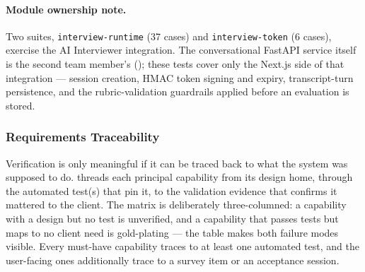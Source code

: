 \paragraph{Module ownership note.}
Two suites, \texttt{interview-runtime} (37 cases) and \texttt{interview-token}
(6 cases), exercise the AI Interviewer integration. The conversational
FastAPI service itself is the second team member's (); these
tests cover only the Next.js side of that integration --- session creation,
HMAC token signing and expiry, transcript-turn persistence, and the
rubric-validation guardrails applied before an evaluation is stored.

\subsubsection{Requirements Traceability}

Verification is only meaningful if it can be traced back to what the system
was supposed to do.  threads each principal
capability from its design home, through the automated test(s) that pin it,
to the validation evidence that confirms it mattered to the client. The
matrix is deliberately three-columned: a capability with a design but no test
is unverified, and a capability that passes tests but maps to no client need
is gold-plating --- the table makes both failure modes visible. Every
must-have capability traces to at least one automated test, and the
user-facing ones additionally trace to a survey item or an acceptance session.

